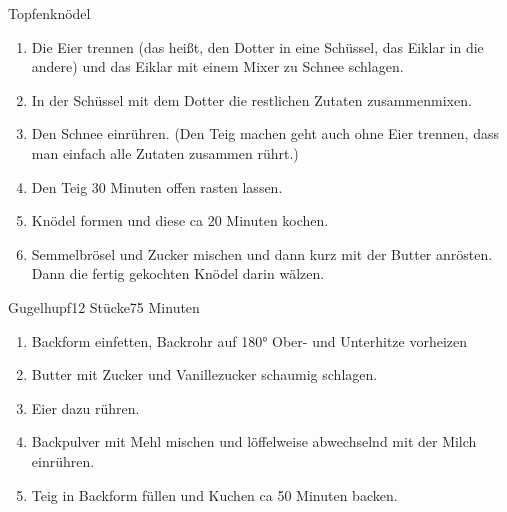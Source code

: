 \documentclass{article}
\begin{document}
\begin{recipe}{Topfenknödel}{}{}



\begin{enumerate}
\item Die Eier trennen (das heißt, den Dotter in eine Schüssel, das Eiklar in die andere) und das Eiklar mit einem Mixer zu Schnee schlagen. 
\item In der Schüssel mit dem Dotter die restlichen Zutaten zusammenmixen.
\item Den Schnee einrühren. (Den Teig machen geht auch ohne Eier trennen, dass man einfach alle Zutaten zusammen rührt.)
\item Den Teig 30 Minuten offen rasten lassen.
\item Knödel formen und diese ca 20 Minuten kochen.
\item Semmelbrösel und Zucker mischen und dann kurz mit der Butter anrösten. Dann die fertig gekochten Knödel darin wälzen.

\end{enumerate}
\end{recipe}

\begin{recipe}{Gugelhupf}{12 Stücke}{75 Minuten}
\begin{enumerate}
  \item Backform einfetten, Backrohr auf 180° Ober- und Unterhitze vorheizen
  \item Butter mit Zucker und Vanillezucker schaumig schlagen.
  \item Eier dazu rühren.
  \item Backpulver mit Mehl mischen und löffelweise abwechselnd mit der Milch einrühren.
  \item Teig in Backform füllen und Kuchen ca 50 Minuten backen.
\end{enumerate}

\end{recipe}
\end{document}
